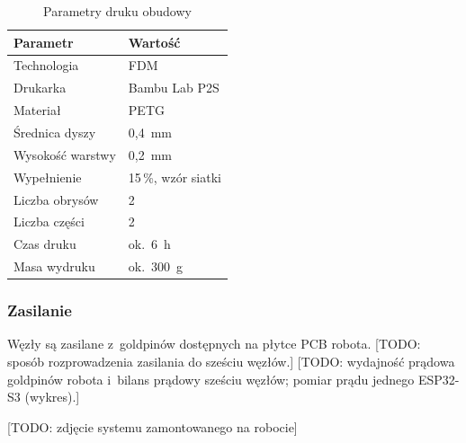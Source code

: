\begin{table}[htbp]
  \centering
  \caption{Parametry druku obudowy}
  \label{tab:parametry-druku}
  \begin{tabular}{ll}
    \toprule
    Parametr & Wartość \\
    \midrule
    Technologia          & FDM \\
    Drukarka             & Bambu Lab P2S \\
    Materiał             & PETG \\
    Średnica dyszy       & 0,4~mm \\
    Wysokość warstwy     & 0,2~mm \\
    Wypełnienie          & 15\,\%, wzór siatki \\
    Liczba obrysów       & 2 \\
    Liczba części        & 2 \\
    Czas druku           & ok.~6~h \\
    Masa wydruku         & ok.~300~g \\
    \bottomrule
  \end{tabular}
\end{table}

\subsubsection*{Zasilanie}
Węzły są zasilane z~goldpinów dostępnych na płytce PCB robota.
[TODO: sposób rozprowadzenia zasilania do sześciu węzłów.]
[TODO: wydajność prądowa goldpinów robota i~bilans prądowy sześciu
węzłów; pomiar prądu jednego ESP32-S3 (wykres).]

[TODO: zdjęcie systemu zamontowanego na robocie]


